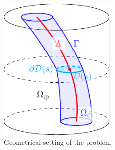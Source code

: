 \documentclass[r]{siamart171218}
\begin{document}
\begin{figure}
\begin{center}
\includegraphics[width=0.5\textwidth]{domain.pdf}
\end{center}
\caption{Geometrical setting of the problem}
\label{fig1}
\end{figure}


\end{document}
